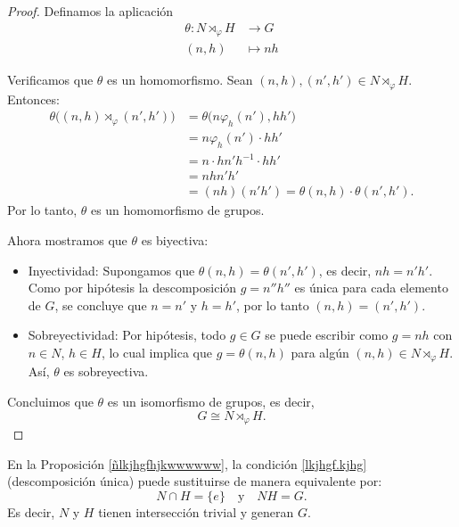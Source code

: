 \medskip
\begin{proof}
	Definamos la aplicación
	\begin{align*}
			\theta: N \rtimes_{\varphi} H &\longrightarrow G \\
			 (n, h) &\longmapsto n h
	\end{align*}
	
	\smallskip
	\noindent Verificamos que \( \theta \) es un homomorfismo. Sean \( (n, h), (n', h') \in N \rtimes_{\varphi} H \). Entonces:
	\begin{align*}
		\theta\big((n,h)\rtimes_{\varphi}(n',h')\big) &= \theta\big(n \varphi_h(n'), hh'\big) \\
		&= n \varphi_h(n') \cdot hh' \\
		&= n \cdot h n' h^{-1} \cdot hh' \\
		&= n h n' h' \\
		&= (nh)(n'h') = \theta(n,h)\cdot \theta(n',h').
	\end{align*}
	Por lo tanto, \( \theta \) es un homomorfismo de grupos.
	
	\smallskip
	\noindent Ahora mostramos que \( \theta \) es biyectiva:	
	\begin{itemize}
		\item Inyectividad: Supongamos que \( \theta(n,h) = \theta(n',h') \), es decir, \( nh = n'h' \). Como por hipótesis la descomposición \( g = n''h'' \) es única para cada elemento de \( G \), se concluye que \( n = n' \) y \( h = h' \), por lo tanto \( (n,h) = (n',h') \).
		
		\item Sobreyectividad: Por hipótesis, todo \( g \in G \) se puede escribir como \( g = n h \) con \( n \in N \), \( h \in H \), lo cual implica que \( g = \theta(n,h) \) para algún \( (n,h) \in N \rtimes_{\varphi} H \). Así, \( \theta \) es sobreyectiva.
	\end{itemize}
	Concluimos que \( \theta \) es un isomorfismo de grupos, es decir,
	\[
	G \cong N \rtimes_{\varphi} H.
	\]
\end{proof}

\begin{observacion}\label{equiv-condicion-descomposicion}
	\upshape
	En la Proposici\'on \ref{ñlkjhgfhjkwwwwww}, la condici\'on \ref{lkjhgf.kjhg} (descomposici\'on \'unica) puede sustituirse de manera equivalente por:  
	\[  
	N \cap H = \{e\} \quad \text{y} \quad NH = G.  
	\]  
	Es decir, $N$ y $H$ tienen intersecci\'on trivial y generan $G$.  
\end{observacion}

